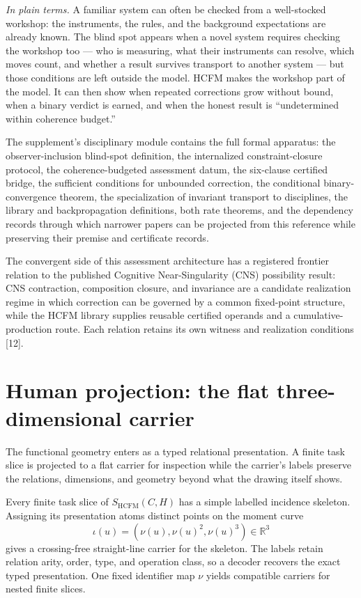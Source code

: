 \documentclass[11pt]{article}
\theoremstyle{definition}
\newcommand{\plainterms}{\emph{In plain terms.}}
\begin{document}
\noindent\plainterms{} A familiar system can often be checked from a well-stocked workshop: the instruments, the rules, and the background expectations are already known. The blind spot appears when a novel system requires checking the workshop too --- who is measuring, what their instruments can resolve, which moves count, and whether a result survives transport to another system --- but those conditions are left outside the model. HCFM makes the workshop part of the model. It can then show when repeated corrections grow without bound, when a binary verdict is earned, and when the honest result is ``undetermined within coherence budget.''

The supplement's disciplinary module contains the full formal apparatus: the observer-inclusion blind-spot definition, the internalized constraint-closure protocol, the coherence-budgeted assessment datum, the six-clause certified bridge, the sufficient conditions for unbounded correction, the conditional binary-convergence theorem, the specialization of invariant transport to disciplines, the library and backpropagation definitions, both rate theorems, and the dependency records through which narrower papers can be projected from this reference while preserving their premise and certificate records.

The convergent side of this assessment architecture has a registered frontier relation to the published Cognitive Near-Singularity (CNS) possibility result: CNS contraction, composition closure, and invariance are a candidate realization regime in which correction can be governed by a common fixed-point structure, while the HCFM library supplies reusable certified operands and a cumulative-production route. Each relation retains its own witness and realization conditions [12].

\section{Human projection: the flat three-dimensional carrier}

The functional geometry enters as a typed relational presentation. A finite task slice is projected to a flat carrier for inspection while the carrier's labels preserve the relations, dimensions, and geometry beyond what the drawing itself shows.

Every finite task slice of $S_{\mathrm{HCFM}}(C, H)$ has a simple labelled incidence skeleton. Assigning its presentation atoms distinct points on the moment curve
\begin{equation}
\iota(u) = (\nu(u), \nu(u)^2, \nu(u)^3) \in \mathbb{R}^3 \tag{14}
\end{equation}
gives a crossing-free straight-line carrier for the skeleton. The labels retain relation arity, order, type, and operation class, so a decoder recovers the exact typed presentation. One fixed identifier map $\nu$ yields compatible carriers for nested finite slices.
\end{document}
